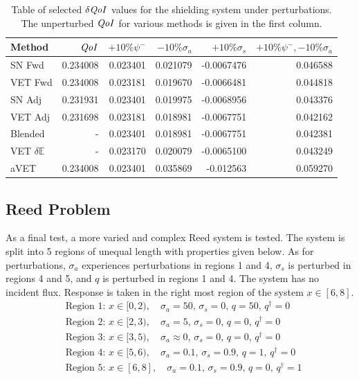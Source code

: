 \documentclass[12pt]{report}
\newcommand{\Edd}{\mathbb{E}}
\newcommand{\sigs}{\sigma_s}
\newcommand{\siga}{\sigma_a}
\newcommand{\qoi}{{\it QoI}\xspace}
\begin{document}
\begin{table}[H]
\centering
  \begin{tabular}{| l | r || r | r | r | r |}
    \hline
    Method  & $\qoi$ & $+10\% \psi^- $  & $-10\% \siga $ & $+10\% \sigs $ & $+10\% \psi^-,-10\% \siga$ \\ \hline
     SN Fwd 			&0.234008 	&0.023401 &0.021079 &-0.0067476 & 0.046588\\ \hline
     VET Fwd			&0.234008 	&0.023181 &0.019670 &-0.0066481 &0.044818\\ \hline
     SN Adj  			&0.231931 	&0.023401 &0.019975 &-0.0068956 &0.043376\\ \hline
     VET Adj 			&0.231698 	&0.023181 &0.018981 &-0.0067751 &0.042162\\ \hline
     Blended 			&-			&0.023401 &0.018981 &-0.0067751 &0.042381\\ \hline
     VET $\delta \Edd$ 	&-			&0.023170 &0.020079 &-0.0065100 &0.043249\\ \hline
     aVET				&0.234008 	&0.023401 &0.035869 &-0.012563	&0.059270\\ \hline
    \end{tabular}
  \caption{Table of selected $\delta \qoi$ values for the shielding system under perturbations. The unperturbed $\qoi$ for various methods is given in the first column.}
  \label{TableT3}
\end{table}

\subsection{Reed Problem}
As a final test, a more varied and complex Reed system is tested. The system is split into 5 regions of unequal length with properties given below. As for perturbations, $\siga$ experiences perturbations in regions 1 and 4, $\sigs$ is perturbed in regions 4 and 5, and $q$ is perturbed in regions 1 and 4. The system has no incident flux. Response is taken in the right most region of the system $x \in [6,8]$.
\begin{equation*}
\begin{split}
&\text{Region 1: } x \in [0,2), \quad \siga=50, \, 			\sigs=0, \, q=50, \, q^\dag=0 \\
&\text{Region 2: } x \in [2,3), \quad \siga=5, \, 			\sigs=0, \, q=0, \, q^\dag=0 \\
&\text{Region 3: } x \in [3,5), \quad \siga \approx 0, \,	\sigs=0, \, q=0, \, q^\dag=0 \\
&\text{Region 4: } x \in [5,6), \quad \siga=0.1, \, 		\sigs=0.9, \, q=1, \, q^\dag=0 \\
&\text{Region 5: } x \in [6,8], \quad \siga=0.1, \, 		\sigs=0.9, \, q=0, \, q^\dag=1 \\
\end{split}
\end{equation*}
\end{document}
